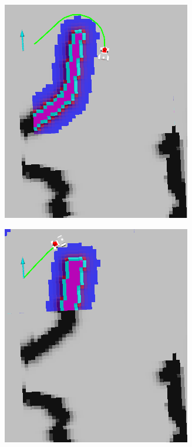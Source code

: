 \documentclass{beamer}
\begin{document}
\begin{frame}
\begin{figure}[H]
\begin{subfigure}[b]{0.24\textwidth}
    \end{subfigure}
    \begin{subfigure}[b]{0.24\textwidth}
        \centering
        \includegraphics[width=\textwidth]{img/succ_3.png}
    \end{subfigure}
    \hfill
    \begin{subfigure}[b]{0.24\textwidth}
        \centering
        \includegraphics[width=\textwidth]{img/succ_4.png}

\end{subfigure}
\end{figure}
\end{frame}
\end{document}
